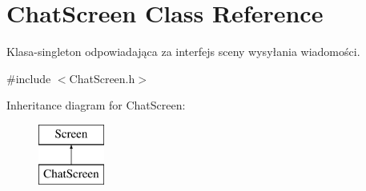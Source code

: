 \hypertarget{class_chat_screen}{}\section{Chat\+Screen Class Reference}
\label{class_chat_screen}


Klasa-\/singleton odpowiadająca za interfejs sceny wysyłania wiadomości.  




{\ttfamily \#include $<$Chat\+Screen.\+h$>$}

Inheritance diagram for Chat\+Screen\+:\begin{figure}[H]
\begin{center}
\leavevmode
\includegraphics[height=2.000000cm]{class_chat_screen}
\end{center}
\end{figure}
